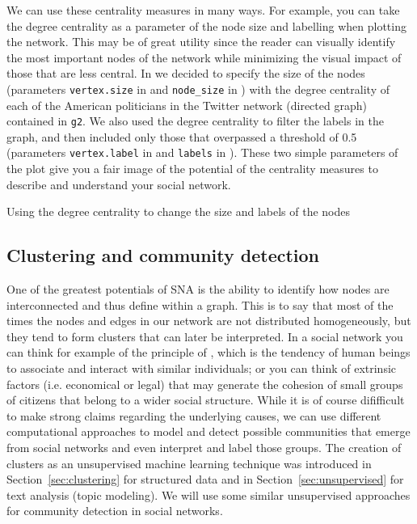 We can use these centrality measures in many ways. For example, you can take the degree centrality as a parameter of the node size and labelling when plotting the network. This may be of great utility since the reader can visually identify the most important nodes of the network while minimizing the visual impact of those that are less central. In  we decided to specify the size of the nodes (parameters \verb|vertex.size| in  and \verb|node_size| in ) with the degree centrality of each of the American politicians in the Twitter network (directed graph) contained in \texttt{g2}. We also used the degree centrality to filter the labels in the graph, and then included only those that overpassed a threshold of 0.5 (parameters \verb|vertex.label| in  and \verb|labels| in ). These two simple parameters of the plot give you a fair image of the potential of the centrality measures to describe and understand your social network.

\begin{ccsexample}
  \caption{Using the degree centrality to change the size and labels of the nodes}
  \label{ex:plotsize}
\end{ccsexample}

\subsection{Clustering and community detection}

One of the greatest potentials of SNA is the ability to identify how nodes are interconnected and thus define  within a graph. This is to say that most of the times the nodes and edges in our network are not distributed homogeneously, but they tend to form clusters that can  later be interpreted. In a social network you can think for example of the principle of , which is the tendency of human beings to associate and interact with similar individuals; or you can think of extrinsic factors (i.e. economical or legal) that may generate the cohesion of small groups of citizens that belong to a wider social structure. While it is of course dififficult to make strong claims regarding the underlying causes, we can use different computational approaches to model and detect possible communities that emerge from social networks and even interpret and label those groups. The creation of clusters as an unsupervised machine learning technique was introduced in Section~\ref{sec:clustering} for structured data and in Section~\ref{sec:unsupervised} for text analysis (topic modeling). We will use some similar unsupervised approaches for community detection in social networks.

